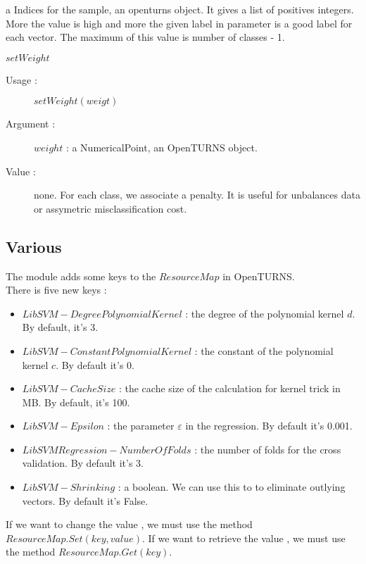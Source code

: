 \begin{description}
\begin{description}
\begin{description}
\begin{description}
       \item a Indices for the sample, an openturns object. It gives a list of positives integers. More the value is high and more the given label in parameter is a good label for each vector. The maximum of this value is number of classes - 1. 
      \end{description}
  \item $setWeight$
    \begin{description}
     \item [Usage :] $setWeight( weigt )$
     \item [Argument :] $weight$ : a NumericalPoint, an OpenTURNS object.
     \item [Value :] none. For each class, we associate a penalty. It is useful for unbalances data or assymetric misclassification cost.
    \end{description}



    \end{description}


    

  \end{description}
\end{description}

\newpage \subsection{Various}

The module adds some keys to the $ResourceMap$ in OpenTURNS.\\

There is five new keys :
\begin{itemize}
 \item $LibSVM-DegreePolynomialKernel$ : the degree of the polynomial kernel $d$. By default, it's 3.
 \item $LibSVM-ConstantPolynomialKernel$ : the constant of the polynomial kernel $c$. By default it's 0.
 \item $LibSVM-CacheSize$ : the cache size of the calculation for kernel trick in MB. By default, it's 100.
 \item $LibSVM-Epsilon$ : the parameter $\varepsilon$ in the regression. By default it's 0.001.
 \item $LibSVMRegression-NumberOfFolds$ : the number of folds for the cross validation. By default it's 3.
 \item $LibSVM-Shrinking$ : a boolean. We can use this to to eliminate outlying vectors. By default it's False. 
\end{itemize}

If we want to change the value , we must use the method $ResourceMap.Set(key,value)$. If we want to retrieve the value , we must use the method $ResourceMap.Get(key)$.













